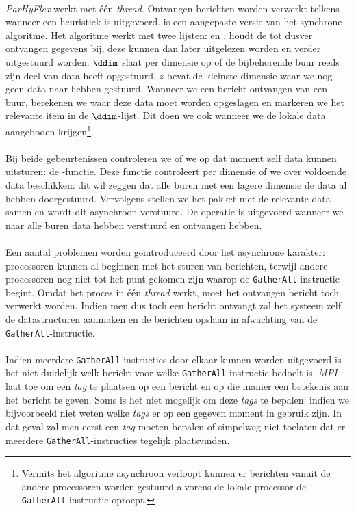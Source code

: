 \paragraph{}
\emph{ParHyFlex} werkt met \'e\'en \emph{thread}. Ontvangen berichten worden verwerkt telkens wanneer een heuristiek is uitgevoerd.  is een aangepaste versie van het synchrone algoritme. Het algoritme werkt met twee lijsten: \dres en \ddim. \dres houdt de tot dusver ontvangen gegevens bij, deze kunnen dan later uitgelezen worden en verder uitgestuurd worden. $\ddim$ slaat per dimensie op of de bijbehorende buur reeds zijn deel van data heeft opgestuurd. $z$ bevat de kleinste dimensie waar we nog geen data naar hebben gestuurd. Wanneer we een bericht ontvangen van een buur, berekenen we waar deze data moet worden opgeslagen en markeren we het relevante item in de $\ddim$-lijst. Dit doen we ook wanneer we de lokale data aangeboden krijgen\footnote{Vermits het algoritme asynchroon verloopt kunnen er berichten vanuit de andere processoren worden gestuurd alvorens de lokale processor de \texttt{GatherAll}-instructie oproept.}.

\paragraph{}
Bij beide gebeurtenissen controleren we of we op dat moment zelf data kunnen uitsturen: de \pzedt{}-functie. Deze functie controleert per dimensie of we over voldoende data beschikken: dit wil zeggen dat alle buren met een lagere dimensie de data al hebben doorgestuurd. Vervolgens stellen we het pakket met de relevante data samen en wordt dit asynchroon verstuurd. De operatie is uitgevoerd wanneer we naar alle buren data hebben verstuurd en ontvangen hebben.

\paragraph{}
Een aantal problemen worden ge\"introduceerd door het asynchrone karakter: processoren kunnen al beginnen met het sturen van berichten, terwijl andere processoren nog niet tot het punt gekomen zijn waarop de \texttt{GatherAll} instructie begint. Omdat het proces in \'e\'en \emph{thread} werkt, moet het ontvangen bericht toch verwerkt worden. Indien men dus toch een bericht ontvangt zal het systeem zelf de datastructuren aanmaken en de berichten opslaan in afwachting van de \texttt{GatherAll}-instructie.

\paragraph{}
Indien meerdere \texttt{GatherAll} instructies door elkaar kunnen worden uitgevoerd is het niet duidelijk welk bericht voor welke \texttt{GatherAll}-instructie bedoelt is. \emph{MPI} laat toe om een \emph{tag} te plaatsen op een bericht en op die manier een betekenis aan het bericht te geven. Soms is het niet mogelijk om deze \emph{tags} te bepalen: indien we bijvoorbeeld niet weten welke \emph{tags} er op een gegeven moment in gebruik zijn. In dat geval zal men eerst een \emph{tag} moeten bepalen of simpelweg niet toelaten dat er meerdere \texttt{GatherAll}-instructies tegelijk plaatsvinden.

